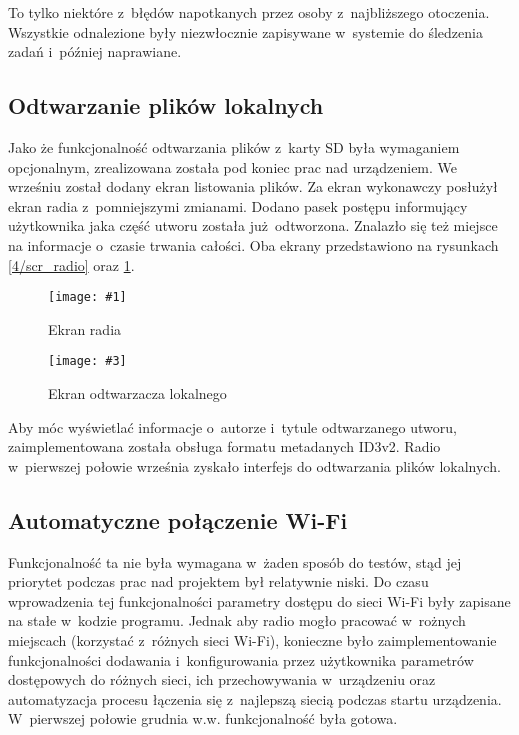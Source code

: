 \documentclass[polish]{aghengthesis}
\newcommand{\imgintss}[5]{
	\begin{figure}[{#5}]
		\centering
		\begin{minipage}{.45\textwidth}
			\centering
			\texttt{[image: \#1]}
			\caption{#2}
			\label{#1}
		\end{minipage}%
		\hfill
		\begin{minipage}{.45\textwidth}
			\centering
			\texttt{[image: \#3]}
			\caption{#4}
			\label{#3}
		\end{minipage}
	\end{figure}
}
\newcommand{\imghss}[4]{\imgintss{#1}{#2}{#3}{#4}{H}}
\begin{document}
			To tylko niektóre z~błędów napotkanych przez osoby z~najbliższego otoczenia. Wszystkie odnalezione były niezwłocznie zapisywane w~systemie do śledzenia zadań i~później naprawiane.
			
		\subsection{Odtwarzanie plików lokalnych}
			Jako że funkcjonalność odtwarzania plików z~karty SD była wymaganiem opcjonalnym, zrealizowana została pod koniec prac nad urządzeniem. We wrześniu został dodany ekran listowania plików. Za ekran wykonawczy posłużył ekran radia z~pomniejszymi zmianami. Dodano pasek postępu informujący użytkownika jaka część utworu została już odtworzona. Znalazło się też miejsce na informacje o~czasie trwania całości. Oba ekrany przedstawiono na rysunkach \ref{4/scr_radio} oraz \ref{4/scr_player}.
			
			\imghss{4/scr_radio}{Ekran radia}{4/scr_player}{Ekran odtwarzacza lokalnego}
			
			Aby móc wyświetlać informacje o~autorze i~tytule odtwarzanego utworu, zaimplementowana została obsługa formatu metadanych ID3v2.
			Radio w~pierwszej połowie września zyskało interfejs do odtwarzania plików lokalnych.
			
		\subsection{Automatyczne połączenie Wi-Fi}
			Funkcjonalność ta nie była wymagana w~żaden sposób do testów, stąd jej priorytet podczas prac nad projektem był relatywnie niski. 
			Do czasu wprowadzenia tej funkcjonalności parametry dostępu do sieci Wi-Fi były zapisane na stałe w~kodzie programu.
			Jednak aby radio mogło pracować w~rożnych miejscach (korzystać z~różnych sieci Wi-Fi), konieczne było
			zaimplementowanie funkcjonalności dodawania i~konfigurowania przez użytkownika parametrów dostępowych do różnych sieci, ich przechowywania w~urządzeniu oraz automatyzacja procesu łączenia się z~najlepszą siecią podczas startu urządzenia.
			W~pierwszej połowie grudnia w.w. funkcjonalność była gotowa.
			 
\end{document}
